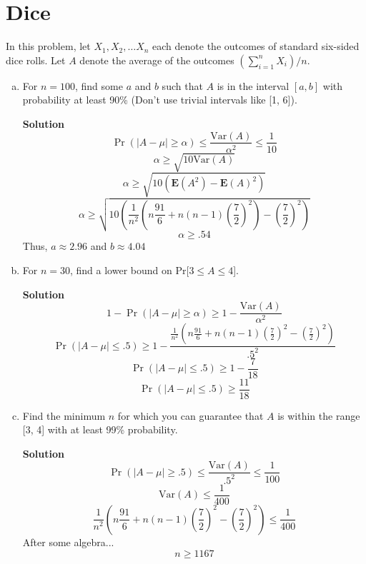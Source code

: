 \documentclass[11pt]{article}
\newcommand*{\Question}[1]{\section{#1}}
\newenvironment{Answer}{\vspace{10pt}\begin{mdframed}\textbf{Solution}\\}{\end{mdframed}\vfill\pagebreak[3]}
\newenvironment{Answer}{\vspace{10pt}}{\vfill\pagebreak[3]}
\newcommand*{\E}{\textbf{E}}
\newcommand*{\Var}[1]{\text{Var}(#1)}
\begin{document}
\Question{Dice}
In this problem, let $X_1, X_2, \dots X_n$ each denote the outcomes of standard six-sided dice rolls. Let $A$ denote the average of the outcomes $(\sum_{i = 1}^n X_i)/n$.
\begin{enumerate}[(a)]
  \item For $n = 100$, find some $a$ and $b$ such that $A$ is in the interval $[a, b]$ with probability at least 90\% (Don't use trivial intervals like [1, 6]).
  \begin{Answer}
    $$\Pr(|A-\mu|\geq \alpha)\leq \frac{\Var{A}}{\alpha^2}\leq \frac{1}{10}$$
    $$\alpha \geq \sqrt{10 \Var{A}}$$
    $$\alpha \geq \sqrt{10(\E(A^2)-\E(A)^2)}$$
    $$\alpha \geq \sqrt{10(\frac{1}{n^2}(n\frac{91}{6}+n(n-1)(\frac{7}{2})^2)-(\frac{7}{2})^2)}$$
    $$\alpha \geq .54$$
    Thus, $a\approx 2.96$ and $b\approx 4.04$
  \end{Answer}

  \item For $n = 30$, find a lower bound on Pr[$3\leq A\leq 4$].
  \begin{Answer}
    $$1-\Pr(|A-\mu|\geq \alpha)\geq 1-\frac{\Var{A}}{\alpha^2}$$
    $$\Pr(|A-\mu|\leq .5)\geq 1-\frac{\frac{1}{n^2}(n\frac{91}{6}+n(n-1)(\frac{7}{2})^2-(\frac{7}{2})^2)}{.5^2}$$
    $$\Pr(|A-\mu|\leq .5)\geq 1-\frac{7}{18}$$
    $$\Pr(|A-\mu|\leq .5)\geq \frac{11}{18}$$
  \end{Answer}

  \item Find the minimum $n$ for which you can guarantee that $A$ is within the range [3, 4] with at least 99\% probability.
  \begin{Answer}
    $$\Pr(|A-\mu|\geq .5)\leq \frac{\Var{A}}{.5^2}\leq \frac{1}{100}$$
    $$\Var{A}\leq \frac{1}{400}$$
    $$\frac{1}{n^2}(n\frac{91}{6}+n(n-1)(\frac{7}{2})^2-(\frac{7}{2})^2) \leq \frac{1}{400}$$
    After some algebra...
    $$n\geq 1167$$
  \end{Answer}
\end{enumerate}
\end{document}
